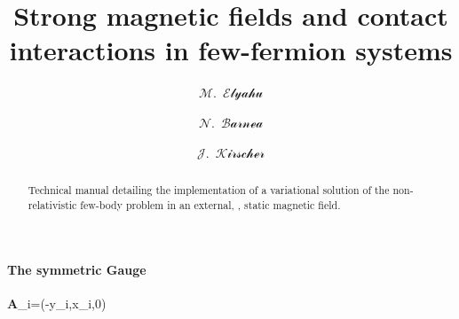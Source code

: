 \documentclass[aps,prd,onecolumn
,tightenlines,letterpaper,notitlepage,
nofootinbib]{revtex4-1}
\begin{document}
\newcommand{\rgm}{$\mathbb{R}$GM}
\newcommand{\bra}[1] {\left\langle~#1~\right|}
\newcommand{\ket}[1] {\left|~#1~\right\rangle}
\newcommand{\lam}[1]{$\Lambda=#1~$fm$^{-1}$}
\newcommand{\parg}[1] {\paragraph*{-\,\textit{#1}\,-}}
\newcommand{\nopi}{\pi\hspace{-6pt}/}
\newcommand{\ve}[1]{\ensuremath{\boldsymbol{#1}}}
\newcommand{\xvec}{\bs{x}}
\newcommand{\rvec}{\bs{r}}
\newcommand{\sgve}{\ensuremath{\boldsymbol{\sigma}}}
\newcommand{\tave}{\ensuremath{\boldsymbol{\tau}}}
\newcommand{\na}{\nabla}
\newcommand{\sumin}{\sum\limits_{i=1}^N}
\newcommand{\sumijn}{\sum\limits_{i<j}^N}
\newcommand{\sumijk}{\sum_\text{cyc.}\sum_{i<j<k}}
\newcommand{\tx}{\tilde{x}}
\newcommand{\eftnopi}{\mbox{EFT($\slashed{\pi}$)}}

\newcommand{\cmment}[2]{\paragraph*{Ecce: #1}\texttt{\textcolor{blue}{#2}}}



\author{$\mathcal{M}$.~$\mathcal{Elyahu}$}
\author{$\mathcal{N}$.~$\mathcal{Barnea}$}
\author{$\mathcal{J}$.~$\mathcal{Kirscher}$}

\title{
Strong magnetic fields and contact interactions in few-fermion systems
} 

\begin{abstract}
Technical manual detailing the implementation of a variational solution of the non-relativistic few-body
problem in an external, \ie, static magnetic field.
\end{abstract}

\pacs{}

\maketitle

\paragraph{The symmetric Gauge}
\be{}
\ve{A}_i=(-y_i,x_i,0)
\ee
\end{document}

